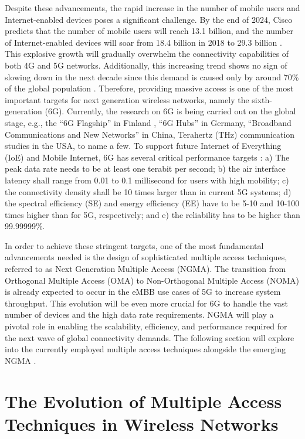 Despite these advancements, the rapid increase in the number of mobile users and Internet-enabled devices poses a significant challenge. By the end of 2024, Cisco predicts that the number of mobile users will reach 13.1 billion, and the number of Internet-enabled devices will soar from 18.4 billion in 2018 to 29.3 billion \cite{cisco2020report}. This explosive growth will gradually overwhelm the connectivity capabilities of both 4G and 5G networks. Additionally, this increasing trend shows no sign of slowing down in the next decade since this demand is caused only by around 70\% of the global population \cite{cisco2020report}. Therefore, providing massive access is one of the most important targets for next generation wireless networks, namely the sixth-generation (6G). Currently, the research on 6G is being carried out on the global stage, e.g., the ``6G Flagship'' in Finland \cite{oulu2021sixg}, ``6G Hubs'' in Germany, ``Broadband Communications and New Networks'' in China, Terahertz (THz) communication studies in the USA, to name a few. To support future Internet of Everything (IoE) and Mobile Internet, 6G has several critical performance targets \cite{zhang2019wireless}: a) The peak data rate needs to be at least one terabit per second; b) the air interface latency shall range from 0.01 to 0.1 millisecond for users with high mobility; c) the connectivity density shall be 10 times larger than in current 5G systems; d) the spectral efficiency (SE) and energy efficiency (EE) have to be 5-10 and 10-100 times higher than for 5G, respectively; and e) the reliability has to be higher than 99.99999\%.

In order to achieve these stringent targets, one of the most fundamental advancements needed is the design of sophisticated multiple access techniques, referred to as Next Generation Multiple Access (NGMA). The transition from Orthogonal Multiple Access (OMA) to Non-Orthogonal Multiple Access (NOMA) is already expected to occur in the eMBB use cases of 5G to increase system throughput. This evolution will be even more crucial for 6G to handle the vast number of devices and the high data rate requirements. NGMA will play a pivotal role in enabling the scalability, efficiency, and performance required for the next wave of global connectivity demands. The following section will explore into the currently employed multiple access techniques alongside the emerging NGMA \cite{nagma2}.

\section{The Evolution of Multiple Access Techniques in Wireless Networks}


